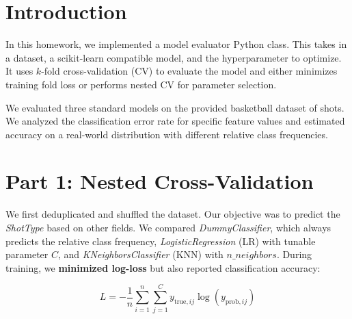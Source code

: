 \documentclass[fleqn,moreauthors,10pt]{ds_report}
\affiliation{\textit{ta5946@fri.uni-lj.si}}
\begin{document}
\flushbottom

\maketitle

\thispagestyle{empty}


\section*{Introduction}
    In this homework, we implemented a model evaluator Python class. This takes in a dataset, a scikit-learn compatible model, and the hyperparameter to optimize. It uses $k$-fold cross-validation (CV) to evaluate the model and either minimizes training fold loss or performs nested CV for parameter selection.

    We evaluated three standard models on the provided basketball dataset of shots. We analyzed the classification error rate for specific feature values and estimated accuracy on a real-world distribution with different relative class frequencies.


\section*{Part 1: Nested Cross-Validation}

We first deduplicated and shuffled the dataset. Our objective was to predict the \textit{ShotType} based on other fields. We compared \textit{DummyClassifier}, which always predicts the relative class frequency, \textit{LogisticRegression} (LR) with tunable parameter $C$, and \textit{KNeighborsClassifier} (KNN) with $n\_neighbors$. During training, we \textbf{minimized log-loss} but also reported classification accuracy:

\begin{equation}
L = - \frac{1}{n} \sum_{i=1}^{n} \sum_{j=1}^{C} y_{\text{true},ij} \log\left(y_{\text{prob},ij}\right)
\end{equation}
\end{document}
